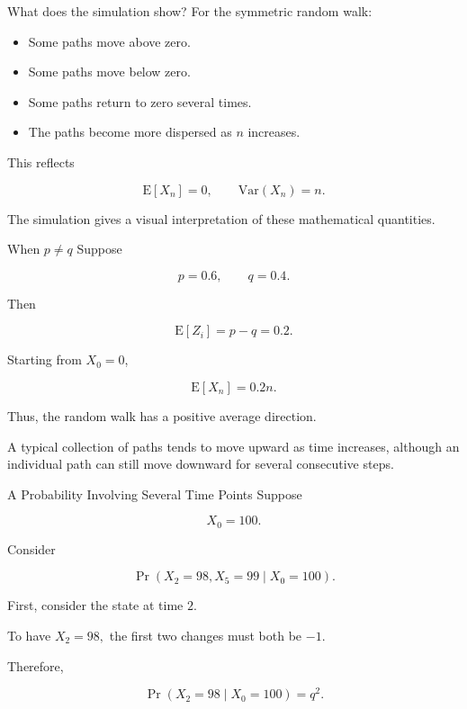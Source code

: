 \documentclass[
  ignorenonframetext,
  aspectratio=169,
]{beamer}
\providecommand{\tightlist}{%
  \setlength{\itemsep}{0pt}\setlength{\parskip}{0pt}}
\begin{document}
\begin{frame}{What does the simulation show?}
\protect{}\label{what-does-the-simulation-show}
For the symmetric random walk:

\begin{itemize}
\tightlist
\item
  Some paths move above zero.
\item
  Some paths move below zero.
\item
  Some paths return to zero several times.
\item
  The paths become more dispersed as \(n\) increases.
\end{itemize}

This reflects

\[
\mathrm{E}[X_n]=0,
\qquad
\mathrm{Var}(X_n)=n.
\]

The simulation gives a visual interpretation of these mathematical
quantities.
\end{frame}

\begin{frame}{When \(p\neq q\)}
\protect{}\label{when-pneq-q}
Suppose

\[
p=0.6,
\qquad
q=0.4.
\]

Then

\[
\mathrm{E}[Z_i]=p-q=0.2.
\]

Starting from \(X_0=0\),

\[
\mathrm{E}[X_n]=0.2n.
\]

Thus, the random walk has a positive average direction.

A typical collection of paths tends to move upward as time increases,
although an individual path can still move downward for several
consecutive steps.
\end{frame}

\begin{frame}{A Probability Involving Several Time Points}
\protect{}\label{a-probability-involving-several-time-points}
Suppose

\[
X_0=100.
\]

Consider

\[
\Pr(X_2=98,X_5=99\mid X_0=100).
\]

First, consider the state at time \(2\).

To have \(X_2=98,\) the first two changes must both be \(-1\).

Therefore,

\[
\Pr(X_2=98\mid X_0=100)=q^2.
\]
\end{frame}
\end{document}
